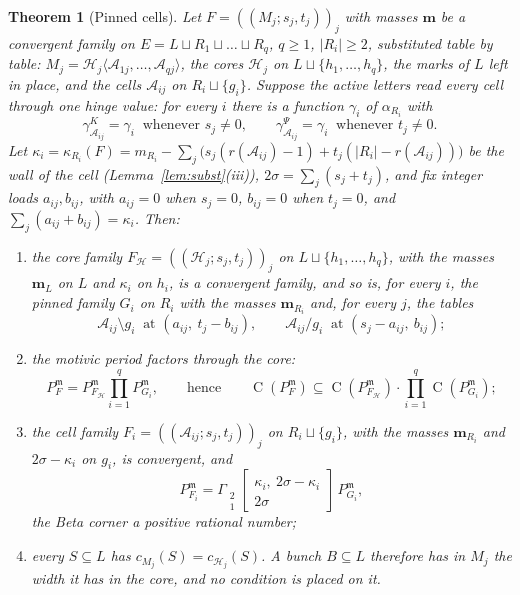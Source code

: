 \documentclass[11pt]{article}
\theoremstyle{plain}
\newtheorem{theorem}{Theorem}
\theoremstyle{definition}
\theoremstyle{remark}
\newcommand{\m}{\mathfrak m}
\newcommand{\bm}{\mathbf m}
\newcommand{\Conj}{\operatorname{C}}
\newcommand{\Gst}[4]{\Gamma_{\substack{#1\\#2}}\!\begin{bmatrix}#3\\#4\end{bmatrix}}
\begin{document}
\begin{theorem}[Pinned cells]\label{thm:C}
Let $F=((M_j;s_j,t_j))_j$ with masses $\bm$ be a convergent family on $E=L\sqcup R_1\sqcup\dots\sqcup R_q$, $q\ge1$, $|R_i|\ge2$, substituted table by table: $M_j=\mathcal H_j\langle\mathcal A_{1j},\dots,\mathcal A_{qj}\rangle$, the cores $\mathcal H_j$ on $L\sqcup\{h_1,\dots,h_q\}$, the marks of $L$ left in place, and the cells $\mathcal A_{ij}$ on $R_i\sqcup\{g_i\}$. Suppose the active letters read every cell through \emph{one hinge value}: for every $i$ there is a function $\gamma_i$ of $\alpha_{R_i}$ with
\[
\gamma^K_{\mathcal A_{ij}}=\gamma_i\ \text{ whenever }s_j\neq0,\qquad \gamma^\Psi_{\mathcal A_{ij}}=\gamma_i\ \text{ whenever }t_j\neq0 .
\]
Let $\kappa_i=\kappa_{R_i}(F)=m_{R_i}-\sum_j\big(s_j(r(\mathcal A_{ij})-1)+t_j(|R_i|-r(\mathcal A_{ij}))\big)$ be the wall of the cell (Lemma~\ref{lem:subst}(iii)), $2\sigma=\sum_j(s_j+t_j)$, and fix integer \emph{loads} $a_{ij},b_{ij}$, with $a_{ij}=0$ when $s_j=0$, $b_{ij}=0$ when $t_j=0$, and $\sum_j(a_{ij}+b_{ij})=\kappa_i$. Then:
\begin{enumerate}[label=(\roman*)]
\item the \emph{core family} $F_{\mathcal H}=((\mathcal H_j;s_j,t_j))_j$ on $L\sqcup\{h_1,\dots,h_q\}$, with the masses $\bm_L$ on $L$ and $\kappa_i$ on $h_i$, is a convergent family, and so is, for every $i$, the \emph{pinned family} $G_i$ on $R_i$ with the masses $\bm_{R_i}$ and, for every $j$, the tables
\[
\mathcal A_{ij}\setminus g_i\ \text{ at }(a_{ij},\ t_j-b_{ij}),\qquad \mathcal A_{ij}/g_i\ \text{ at }(s_j-a_{ij},\ b_{ij});
\]
\item the motivic period factors through the core:
\[
P_F^{\m}=P_{F_{\mathcal H}}^{\m}\prod_{i=1}^qP_{G_i}^{\m},\qquad\text{hence}\qquad \Conj(P_F^{\m})\subseteq\Conj(P_{F_{\mathcal H}}^{\m})\cdot\prod_{i=1}^q\Conj(P_{G_i}^{\m});
\]
\item the \emph{cell family} $F_i=((\mathcal A_{ij};s_j,t_j))_j$ on $R_i\sqcup\{g_i\}$, with the masses $\bm_{R_i}$ and $2\sigma-\kappa_i$ on $g_i$, is convergent, and
\[
P_{F_i}^{\m}=\Gst21{\kappa_i,\ 2\sigma-\kappa_i}{2\sigma}\,P_{G_i}^{\m},
\]
the Beta corner a positive rational number;
\item every $S\subseteq L$ has $c_{M_j}(S)=c_{\mathcal H_j}(S)$. A bunch $B\subseteq L$ therefore has in $M_j$ the width it has in the core, and no condition is placed on it.
\end{enumerate}
\end{theorem}
\end{document}
